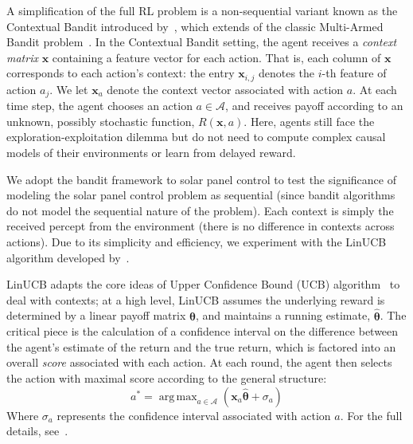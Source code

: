 \documentclass{article}
\newcommand{\mc}{\mathcal}
\DeclareMathOperator*{\argmax}{arg\,max}
\begin{document}
{A simplification of the full RL problem is a non-sequential variant known as the Contextual Bandit introduced by~\citet{wang2005bandit}, which extends of the classic Multi-Armed Bandit problem~\cite{gittins1979bandit}. In the Contextual Bandit setting, the agent receives a {\it context matrix} $\bm{x}$ containing a feature vector for each action. That is, each column of $\bm{x}$ corresponds to each action's context: the entry $\bm{x}_{i,j}$ denotes the $i$-th feature of action $a_j$. We let $\bm{x}_a$ denote the context vector associated with action $a$. At each time step, the agent chooses an action $a \in \mc{A}$, and receives payoff according to an unknown, possibly stochastic function, $R(\bm{x},a)$. Here, agents still face the exploration-exploitation dilemma but do not need to compute complex causal models of their environments or learn from delayed reward.

We adopt the bandit framework to solar panel control to test the significance of modeling the solar panel control problem as sequential (since bandit algorithms do not model the sequential nature of the problem). Each context is simply the received percept from the environment (there is no difference in contexts across actions). Due to its simplicity and efficiency, we experiment with the LinUCB algorithm developed by~\citet{li2010contextual}.

LinUCB adapts the core ideas of Upper Confidence Bound (UCB) algorithm~\cite{auer2002finite} to deal with contexts; at a high level, LinUCB assumes the underlying reward is determined by a linear payoff matrix $\bm{\theta}$, and maintains a running estimate, $\hat{\bm{\theta}}$. The critical piece is the calculation of a confidence interval on the difference between the agent's estimate of the return and the true return, which is factored into an overall {\it score} associated with each action. At each round, the agent then selects the action with maximal score according to the general structure:
\begin{equation}
a^* = \argmax_{a \in \mc{A}} \left(\bm{x}_a \hat{\bm{\theta}} + \sigma_{a}\right)
\end{equation}
Where $\sigma_a$ represents the confidence interval associated with action $a$. For the full details, see~\citet{li2010contextual}.

}
\end{document}
